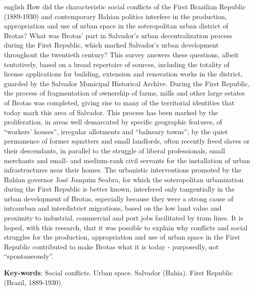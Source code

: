 \begin{resumo}[Abstract]
 \begin{otherlanguage*}{english}
How did the characteristic social conflicts of the First Brazilian Republic (1889-1930) and contemporary Bahian politics interfere in the production, appropriation and use of urban space in the soteropolitan urban district of Brotas? What was Brotas' part in Salvador's urban decentralization process during the First Republic, which marked Salvador's urban development throughout the twentieth century? This survey answers these questions, albeit tentatively, based on a broad repertoire of sources, including the totality of license applications for building, extension and renovation works in the district, guarded by the Salvador Municipal Historical Archive. During the First Republic, the process of fragmentation of ownership of farms, mills and other large estates of Brotas was completed, giving rise to many of the territorial identities that today mark this area of Salvador. This process has been marked by the proliferation, in areas well demarcated by specific geographic features, of “workers' houses”, irregular allotments and “balneary towns”; by the quiet permanence of former squatters and small landlords, often recently freed slaves or their descendants, in parallel to the struggle of liberal professionals, small merchants and small- and medium-rank civil servants for the installation of urban infrastructures near their homes. The urbanistic interventions promoted by the Bahian governor José Joaquim Seabra, for which the soteropolitan urbanization during the First Republic is better known, interfered only tangentially in the urban development of Brotas, especially because they were a strong cause of intraurban and interdistrict migrations, based on the low land value and proximity to industrial, commercial and port jobs facilitated by tram lines. It is hoped, with this research, that it was possible to explain why conflicts and social struggles for the production, appropriation and use of urban space in the First Republic contributed to make Brotas what it is today - purposedly, not “spontaneously”.

   \vspace{\onelineskip}
 
   \noindent 
   \textbf{Key-words}: Social conflicts. Urban space. Salvador (Bahia). First Republic (Brazil, 1889-1930).
 \end{otherlanguage*}
\end{resumo}

